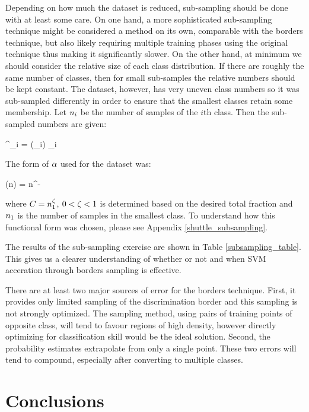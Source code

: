 Depending on how much the dataset is reduced, sub-sampling should be done with at
least some care. 
On one hand, a more sophisticated sub-sampling technique might be considered a method on its own, 
comparable with the borders technique, but also likely requiring multiple training phases using the
original technique thus making it significantly slower.
On the other hand, at minimum we should consider the relative size of each class distribution.
If there are roughly the same number of classes, then for small sub-samples the relative
numbers should be kept constant.
The  dataset, however, has very uneven class numbers so it was sub-sampled differently
in order to ensure that the smallest classes retain some membership.
Let $n_i$ be the number of samples of the $i$th class.
Then the sub-sampled numbers are given:
\begin{eqnnon}
	\classsize^\prime_i = \subsample(\classsize_i) \classsize_i
	\label{subsample}
\end{eqnnon}
The form of $\alpha$ used for the  dataset was:
\begin{eqnnon}
	\subsample(n) = \submultcoef n^{-\subexp}
	\label{subfunction}
\end{eqnnon}
where $C=n_1^\zeta$, $0 < \zeta < 1$ is determined based on the
desired total fraction and $n_1$ is the number of samples in the 
smallest class.
To understand how this functional form was chosen, please see Appendix \ref{shuttle_subsampling}.

The results of the sub-sampling exercise are shown in Table \ref{subsampling_table}.
This gives us a clearer understanding of whether or not and
when SVM acceration through borders sampling is effective.

There are at least two major sources of error for the borders technique.
First, it provides only limited sampling of the discrimination
border and this sampling is not strongly optimized.
The sampling method, using pairs of training points of opposite class, will
tend to favour regions of high density, however  
directly optimizing for classification skill would be the ideal solution.
Second, the probability estimates extrapolate from only a single point.
These two errors will tend to compound, especially after converting to
multiple classes.

\section{Conclusions}

